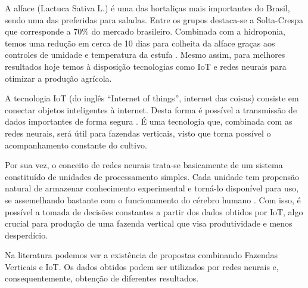 A alface (Lactuca Sativa L.) é uma das hortaliças mais importantes do Brasil, sendo uma das preferidas para saladas. Entre os grupos destaca-se a Solta-Crespa que corresponde a 70\% do mercado brasileiro. Combinada com a hidroponia, temos uma redução em cerca de 10 dias para colheita da alface graças aos controles de umidade e temperatura da estufa \cite{luz2006}. Mesmo assim, para melhores resultados hoje temos à disposição tecnologias como IoT e redes neurais para otimizar a produção agrícola.

A tecnologia IoT (do inglês “Internet of things”, internet das coisas) consiste em conectar objetos inteligentes à internet. Desta forma é possível a transmissão de dados importantes de forma segura \cite{carnaz2016}. É uma tecnologia que, combinada com as redes neurais, será útil para fazendas verticais, visto que torna possível o acompanhamento constante do cultivo.

Por sua vez, o conceito de redes neurais trata-se basicamente de um sistema constituído de unidades de processamento simples. Cada unidade tem propensão natural de armazenar conhecimento experimental e torná-lo disponível para uso, se assemelhando bastante com o funcionamento do cérebro humano \cite{haykin2001}. Com isso, é possível a tomada de decisões constantes a partir dos dados obtidos por IoT, algo crucial para produção de uma fazenda vertical que visa produtividade e menos desperdício.

Na literatura podemos ver a existência de propostas combinando Fazendas Verticais e IoT. Os dados obtidos podem ser utilizados por redes neurais e, consequentemente, obtenção de diferentes resultados.
